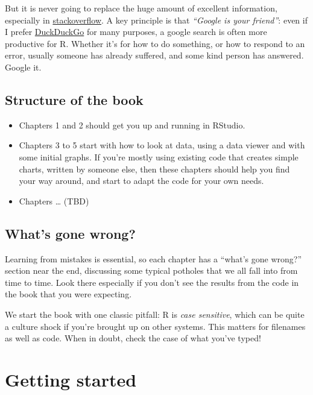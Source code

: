 \documentclass[
]{book}
\providecommand{\tightlist}{%
  \setlength{\itemsep}{0pt}\setlength{\parskip}{0pt}}
\begin{document}
But it is never going to replace the huge amount of excellent information, especially in \href{https://stackoverflow.com/}{stackoverflow}. A key principle is that \emph{``Google is your friend''}: even if I prefer \href{https://www.duckduckgo.com}{DuckDuckGo} for many purposes, a google search is often more productive for R. Whether it's for how to do something, or how to respond to an error, usually someone has already suffered, and some kind person has answered. Google it.

\hypertarget{structure-of-the-book}{%
\section{Structure of the book}\label{structure-of-the-book}}

\begin{itemize}
\tightlist
\item
  Chapters 1 and 2 should get you up and running in RStudio.
\item
  Chapters 3 to 5 start with how to look at data, using a data viewer and with some initial graphs. If you're mostly using existing code that creates simple charts, written by someone else, then these chapters should help you find your way around, and start to adapt the code for your own needs.
\item
  Chapters \ldots{} (TBD)
\end{itemize}

\hypertarget{whats-gone-wrong}{%
\section{What's gone wrong?}\label{whats-gone-wrong}}

Learning from mistakes is essential, so each chapter has a ``what's gone wrong?'' section near the end, discussing some typical potholes that we all fall into from time to time. Look there especially if you don't see the results from the code in the book that you were expecting.

We start the book with one classic pitfall: R is \emph{case sensitive}, which can be quite a culture shock if you're brought up on other systems. This matters for filenames as well as code. When in doubt, check the case of what you've typed!

\hypertarget{start}{%
\chapter{Getting started}\label{start}}
\end{document}
